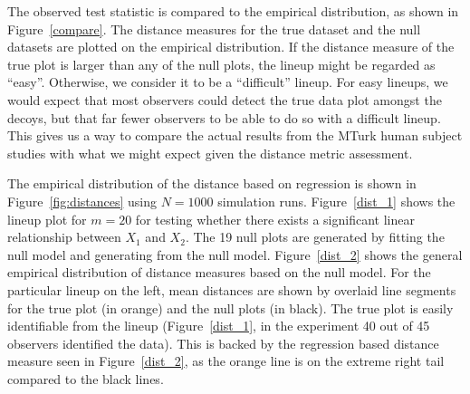 \documentclass[12pt]{article}\usepackage[]{graphicx}\usepackage[]{color}
\begin{document}
The observed test statistic is  compared to the empirical distribution, as shown in Figure~\ref{compare}. The distance measures for the true dataset and the null datasets are plotted on the empirical distribution. If the distance measure of the true plot is larger than any of the null plots, the lineup might be regarded as ``easy''. Otherwise, we consider it to be a ``difficult'' lineup. For easy lineups, we would expect that most observers could detect the true data plot amongst the decoys, but that far fewer observers to be able to do so with a difficult lineup. This gives us a way to compare the actual results from the MTurk human subject studies with what we might expect given the distance metric assessment.

The empirical distribution of the distance based on regression is shown in Figure~\ref{fig:distances} using $N = 1000$ simulation runs. 
Figure~\ref{dist_1} shows the lineup plot for $m = 20$ for testing whether there exists a significant linear relationship between $X_1$ and $X_2$. The 19 null plots are generated by fitting the null model and generating from the null model. Figure~\ref{dist_2} shows the general empirical distribution of distance measures based on the null model. For the particular lineup on the left, mean distances  are shown by overlaid line segments for the true plot (in orange) and the null plots (in black). The true plot is easily identifiable from the lineup (Figure~\ref{dist_1}, in the experiment 40 out of 45 observers identified the data). This is backed by the regression based distance measure seen in Figure~\ref{dist_2}, as the orange line is on the extreme right tail compared to the black lines. 
\end{document}
